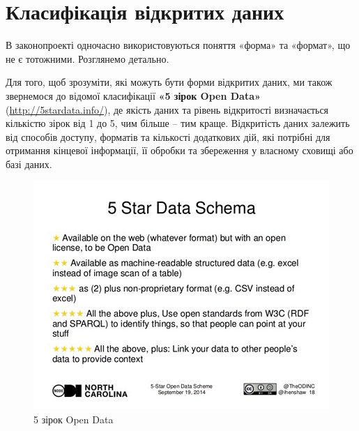 \section{Класифікація відкритих даних}

В законопроекті одночасно використовуються поняття «форма» та «формат», що не є тотожними. Розглянемо детально.

Для того, щоб зрозуміти, які можуть бути форми відкритих даних, ми також звернемося до відомої класифікації \textbf{«5 зірок Open Data»} (\url{http://5stardata.info/}), де якість даних та рівень відкритості визначається кількістю зірок від 1 до 5, чим більше – тим краще. Відкритість даних залежить від способів доступу, форматів та кількості додаткових дій, які потрібні для отримання кінцевої інформації, її обробки та збереження у власному сховищі або базі даних.

\begin{figure}[h]
    \centering
    \includegraphics[width=\textwidth]{images/001.jpg}
    \caption{5 зірок Open Data}
\end{figure}

